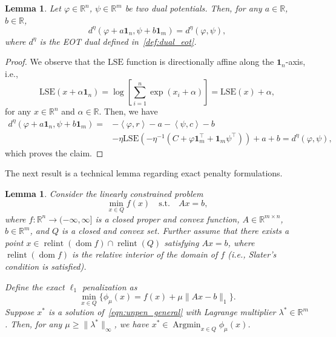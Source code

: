 \documentclass[10pt]{article}
\newcommand{\R}{\mathbb{R}}
\DeclareMathOperator*{\Argmin}{Argmin}
\newcommand{\inner}[2]{\left\langle #1,#2\right\rangle}
\newcommand{\LSE}{\mathrm{LSE}}
\theoremstyle{plain}
\newtheorem{lemma}[theorem]{Lemma}
\theoremstyle{definition}
\theoremstyle{remark}
\newcommand{\one}{\mathbf{1}}
\begin{document}
\begin{lemma}\label{lem:logsumexp_additive}
    Let $\varphi\in\R^n$, $\psi\in \R^m $ be two dual potentials. Then, for any $a\in\R$, $b\in\R$,
    \[
    d^{\eta }(\varphi + a\one_n,\psi+b\one_m)=d^{\eta }(\varphi,\psi),
    \]
    where $d^{\eta }$ is the EOT dual defined in~\eqref{def:dual_eot}.
\end{lemma}
\begin{proof}
    We observe that the $\LSE$ function is directionally affine along the $\one_n$-axis, i.e.,
    \[\LSE(x+\alpha\one_n) = \log\left[\sum_{i=1}^n\exp\left(x_i+\alpha\right)\right]=\LSE(x)+\alpha,\]
    for any $x\in\R^n$ and $\alpha\in\R$.
    Then, we have
    \[
    \begin{split}
        d^{\eta }(\varphi + a\one_n,\psi+b\one_m)=&-\inner{\varphi}{r} - a -\inner{\psi}{c}-b\\
        &-\eta \LSE\left(-\eta ^{-1}(C + \varphi\one_m^\top + \one_m\psi^\top)\right) + a + b=d^{\eta }(\varphi,\psi),
    \end{split}
    \]
    which proves the claim.
\end{proof}
The next result is a technical lemma regarding exact penalty formulations.
\begin{lemma}\label{lem:affine_minimizer}
    Consider the linearly constrained problem
    \begin{equation}\label{eqn:unpen_general}
    \min_{x\in Q} f(x)\quad\text{s.t.}\quad Ax=b,
    \end{equation}
    where $f:\R^n\to(-\infty,\infty]$ is a closed proper and convex function, $A\in\R^{m\times n}$, $b\in\R^m$, and $Q$ is a closed and convex set. Further assume that there exists a point $x\in\operatorname{relint}(\operatorname{dom}f)\cap \operatorname{relint}(Q)$ satisfying $Ax=b$, where $\operatorname{relint}(\operatorname{dom}f)$ is the relative interior of the domain of $f$ (i.e., Slater's condition is satisfied).
    
    Define the exact $\ell_1$ penalization as
    \begin{equation}\label{eqn:l1_pen_general}
    \min_{x\in Q} \{\phi_\mu(x)=f(x) + \mu\|Ax-b\|_1\}.
    \end{equation}
    Suppose $x^*$ is a solution of~\eqref{eqn:unpen_general} with Lagrange multiplier $\lambda^*\in\R^m$. Then, for any $\mu\geq\|\lambda^*\|_\infty$, we have $x^*\in\Argmin_{x\in Q}\phi_\mu(x)$. 
\end{lemma}
\end{document}
